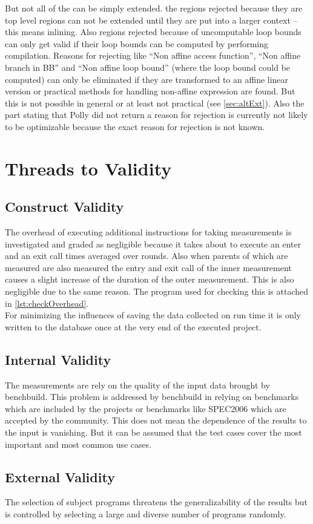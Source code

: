 But not all of the \scops can be simply extended.
\Eg the regions rejected because they are top level regions can not be extended until they are put into a larger context -- this means inlining.
Also regions rejected because of uncomputable loop bounds can only get valid if their loop bounds can be computed \eg by performing \jit compilation.
Reasons for rejecting like \enquote{Non affine access function}, \enquote{Non affine branch in BB} and \enquote{Non affine loop bound} (where the loop bound could be computed) can only be eliminated if they are transformed to an affine linear version or practical methods for handling non-affine expression are found.
But this is not possible in general or at least not practical (see \autoref{sec:altExt}).
Also the part stating that Polly did not return a reason for rejection is currently not likely to be optimizable because the exact reason for rejection is not known.

\section{Threads to Validity}
\subsection{Construct Validity}
The overhead of executing additional instructions for taking measurements is investigated and graded as negligible because it takes about \measurementOverhead to execute an enter and an exit call \overheadIterations times averaged over \overheadRounds rounds.
Also when parents of \scops which are measured are also measured the entry and exit call of the inner measurement causes a slight increase of the duration of the outer measurement.
This is also negligible due to the same reason.
The program used for checking this is attached in \autoref{lst:checkOverhead}.\\
For minimizing the influences of saving the data collected on run time it is only written to the database once at the very end of the executed project.\\
\subsection{Internal Validity}
The measurements are rely on the quality of the input data brought by benchbuild.
This problem is addressed by benchbuild in relying on benchmarks which are included by the projects or benchmarks like SPEC2006 which are accepted by the community.
This does not mean the dependence of the results to the input is vanishing.
But it can be assumed that the test cases cover the most important and most common use cases.
\subsection{External Validity}
The selection of subject programs threatens the generalizability of the results but is controlled by selecting a large and diverse number of programs randomly.
